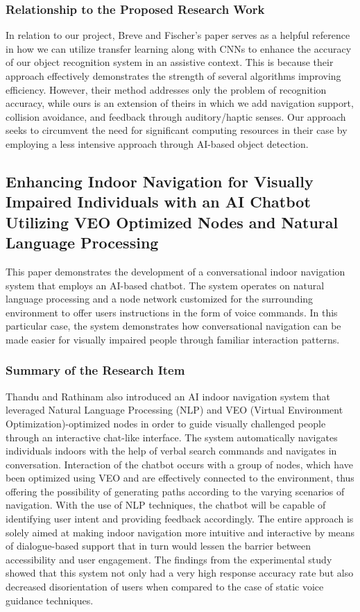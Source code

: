 \documentclass{FastFyp}
\begin{document}
\subsubsection{Relationship to the Proposed Research Work}  
In relation to our project, Breve and Fischer's paper \cite{ref:breve2020visually} serves as a helpful reference in how we can utilize transfer learning along with CNNs to enhance the accuracy of our object recognition system in an assistive context. This is because their approach effectively demonstrates the strength of several algorithms improving efficiency. However, their method addresses only the problem of recognition accuracy, while ours is an extension of theirs in which we add navigation support, collision avoidance, and feedback through auditory/haptic senses. Our approach seeks to circumvent the need for significant computing resources in their case by employing a less intensive approach through AI-based object detection.

\subsection{Enhancing Indoor Navigation for Visually Impaired Individuals with an AI Chatbot Utilizing VEO Optimized Nodes and Natural Language Processing}
This paper demonstrates the development of a conversational indoor navigation system that employs an AI-based chatbot. The system operates on natural language processing and a node network customized for the surrounding environment to offer users instructions in the form of voice commands. In this particular case, the system demonstrates how conversational navigation can be made easier for visually impaired people through familiar interaction patterns.

\subsubsection{Summary of the Research Item}

Thandu and Rathinam \cite{ref:thandu2024enhancing} also introduced an AI indoor navigation system that leveraged Natural Language Processing (NLP) and VEO (Virtual Environment Optimization)-optimized nodes in order to guide visually challenged people through an interactive chat-like interface. The system automatically navigates individuals indoors with the help of verbal search commands and navigates in conversation. Interaction of the chatbot occurs with a group of nodes, which have been optimized using VEO and are effectively connected to the environment, thus offering the possibility of generating paths according to the varying scenarios of navigation. With the use of NLP techniques, the chatbot will be capable of identifying user intent and providing feedback accordingly. The entire approach is solely aimed at making indoor navigation more intuitive and interactive by means of dialogue-based support that in turn would lessen the barrier between accessibility and user engagement. The findings from the experimental study showed that this system not only had a very high response accuracy rate but also decreased disorientation of users when compared to the case of static voice guidance techniques.
\end{document}
